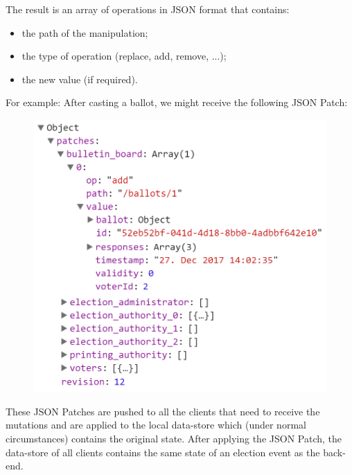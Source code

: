 The result is an array of operations in JSON format that contains:
\begin{itemize}
	\item the path of the manipulation;
	\item the type of operation (replace, add, remove, ...);
	\item the new value (if required).
\end{itemize}

For example: After casting a ballot, we might receive the following JSON Patch:

\begin{figure}
\begin{center}
\includegraphics[scale=0.6]{assets/jsonpatchexample.png}
\label{JSON Patch example}%
\end{center}
\end{figure}
These JSON Patches are pushed to all the clients that need to receive the mutations and are applied to the local data-store which (under normal circumstances) contains the original state. After applying the JSON Patch, the data-store of all clients contains the same state of an election event as the back-end.

